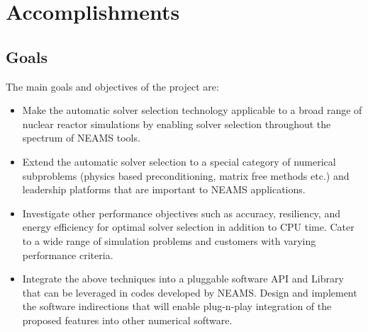 \section{Accomplishments}


\subsection{Goals}
The main goals and objectives of the project are:
\begin{itemize}
\item Make the automatic solver selection technology applicable to a broad range of nuclear reactor simulations by enabling solver selection throughout the spectrum of NEAMS tools. 
\item Extend the automatic solver selection to a special category of numerical subproblems (physics based preconditioning, matrix free methods etc.) and leadership platforms that are important to NEAMS applications. 
\item Investigate other performance objectives such as accuracy, resiliency, and energy efficiency for optimal solver selection in addition to CPU time. Cater to a wide range of simulation problems and customers with varying performance criteria. 
\item Integrate the above techniques into a pluggable software API and Library that can be leveraged in codes developed by NEAMS. Design and implement the software indirections that will enable plug-n-play integration of the proposed features into other numerical software.
\end{itemize}

